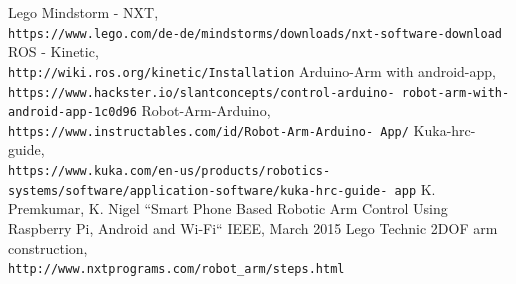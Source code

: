 \documentclass[conference]{IEEEtran}
\begin{document}
\begin{thebibliography}{00}
Lego Mindstorm - NXT,
\\\texttt{https://www.lego.com/de-de/mindstorms/downloads/nxt-software-download}
ROS - Kinetic,
\\\texttt{http://wiki.ros.org/kinetic/Installation}
Arduino-Arm with android-app,
\\\texttt{https://www.hackster.io/slantconcepts/control-arduino-
	robot-arm-with-android-app-1c0d96}
Robot-Arm-Arduino,
\\\texttt{https://www.instructables.com/id/Robot-Arm-Arduino-
	App/}
Kuka-hrc-guide,
\\\texttt{https://www.kuka.com/en-us/products/robotics-
	systems/software/application-software/kuka-hrc-guide-
	app}
K. Premkumar, K. Nigel ``Smart Phone Based Robotic Arm Control Using
Raspberry Pi, Android and Wi-Fi`` IEEE, March 2015
Lego Technic 2DOF arm construction,
\\\texttt{http://www.nxtprograms.com/robot\_arm/steps.html}

\end{thebibliography}
\end{document}
